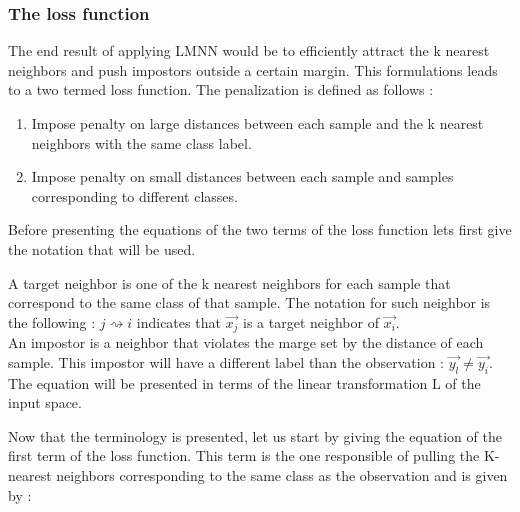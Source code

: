\documentclass[hidelinks,12pt]{report}
\begin{document}
\subsubsection{The loss function}
The end result of applying LMNN would be to efficiently attract the k nearest neighbors and push impostors outside a certain margin. This formulations leads to a two termed loss function. The penalization is defined as follows : \begin{enumerate}\item Impose penalty on large distances between each sample and the k nearest neighbors with the same class label.
\item Impose penalty on small distances between each sample and samples corresponding to different classes.
\end{enumerate}
Before presenting the equations of the two terms of the loss function lets first give the notation that will be used. \par A target neighbor is one of the k nearest neighbors for each sample that correspond to the same class of that sample. The notation for such neighbor is the following : $j \rightsquigarrow i$ indicates that $\vec{x_j}$ is a target neighbor of $\vec{x_i}$. \\
An impostor is a neighbor that violates the marge set by the distance of each sample. This impostor will have a different label than the observation : $\vec{y_l}\neq \vec{y_i}$.\\
The equation will be presented in terms of the linear transformation L of the input space.\par 

Now that the terminology is presented, let us start by giving the equation of the first term of the loss function. This term is the one responsible of pulling the K-nearest neighbors corresponding to the same class as the observation and is given by :
\end{document}
